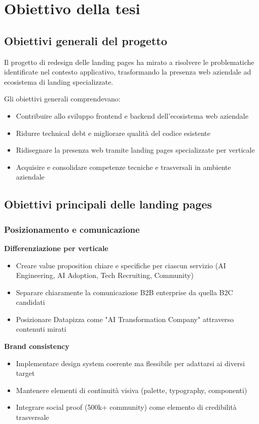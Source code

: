 \chapter{Obiettivo della tesi}

\section{Obiettivi generali del progetto}
Il progetto di redesign delle landing pages ha mirato a risolvere le problematiche identificate nel contesto applicativo, trasformando la presenza web aziendale ad ecosistema di landing specializzate.

Gli obiettivi generali comprendevano:
\begin{itemize}
  \item Contribuire allo sviluppo frontend e backend dell'ecosistema web aziendale
  \item Ridurre technical debt e migliorare qualità del codice esistente
  \item Ridisegnare la presenza web tramite landing pages specializzate per verticale
  \item Acquisire e consolidare competenze tecniche e trasversali in ambiente aziendale
\end{itemize}

\section{Obiettivi principali delle landing pages}

\subsection{Posizionamento e comunicazione}
\textbf{Differenziazione per verticale}
\begin{itemize}
  \item Creare value proposition chiare e specifiche per ciascun servizio (AI Engineering, AI Adoption, Tech Recruiting, Community)
  \item Separare chiaramente la comunicazione B2B enterprise da quella B2C candidati
  \item Posizionare Datapizza come "AI Transformation Company" attraverso contenuti mirati
\end{itemize}

\textbf{Brand consistency}
\begin{itemize}
  \item Implementare design system coerente ma flessibile per adattarsi ai diversi target
  \item Mantenere elementi di continuità visiva (palette, typography, componenti)
  \item Integrare social proof (500k+ community) come elemento di credibilità trasversale
\end{itemize}

